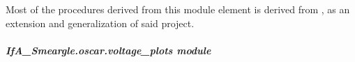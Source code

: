 \documentclass[letterpaper,10pt,english]{sphinxmanual}
\begin{document}
Most of the procedures derived from this module element is derived from
, as an extension and generalization of said project.


\subparagraph{IfA\_Smeargle.oscar.voltage\_plots module}
\label{\detokenize{python_docstrings/IfA_Smeargle.oscar.voltage_plots:module-IfA_Smeargle.oscar.voltage_plots}}\label{\detokenize{python_docstrings/IfA_Smeargle.oscar.voltage_plots:ifa-smeargle-oscar-voltage-plots-module}}\label{\detokenize{python_docstrings/IfA_Smeargle.oscar.voltage_plots::doc}}
\end{document}
